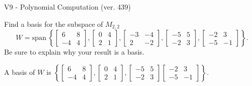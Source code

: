 \begin{exercise}
  \begin{exerciseTitle}V9 - Polynomial Computation (ver. 439)\end{exerciseTitle}
  \begin{exerciseStatement}
    Find a basis for the subspace of \(M_{2,2}\) 
\[W=\mathrm{span}\ \left\{\left[\begin{array}{cc}
6 & 8 \\
-4 & 4
\end{array}\right] , \left[\begin{array}{cc}
0 & 4 \\
2 & 1
\end{array}\right] , \left[\begin{array}{cc}
-3 & -4 \\
2 & -2
\end{array}\right] , \left[\begin{array}{cc}
-5 & 5 \\
-2 & 3
\end{array}\right] , \left[\begin{array}{cc}
-2 & 3 \\
-5 & -1
\end{array}\right]\right\}.\]
 Be sure to explain why your result is a basis.


  \end{exerciseStatement}
  \begin{exerciseAnswer}
   A basis of \(W\) is  \(\left\{\left[\begin{array}{cc}
6 & 8 \\
-4 & 4
\end{array}\right] , \left[\begin{array}{cc}
0 & 4 \\
2 & 1
\end{array}\right] , \left[\begin{array}{cc}
-5 & 5 \\
-2 & 3
\end{array}\right] \left[\begin{array}{cc}
-2 & 3 \\
-5 & -1
\end{array}\right]\right\}\).
  


  \end{exerciseAnswer}
\end{exercise}